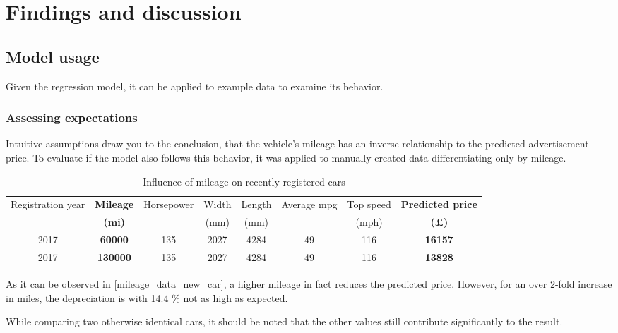 \chapter{Findings and discussion}
\section{Model usage}
Given the regression model, it can be applied to example data to examine its behavior.
\subsection{Assessing expectations}
Intuitive assumptions draw you to the conclusion, that the vehicle's mileage has an inverse relationship to the predicted advertisement price.
To evaluate if the model also follows this behavior, it was applied to manually created data differentiating only by mileage.
\begin{table}[H]
    \begin{adjustbox}{width={\textwidth}}
        \begin{tabular}{|c|c|c|c|c|c|c|c|}
            \hline
            Registration year & \textbf{Mileage} & Horsepower & Width & Length & Average mpg & Top speed & \textbf{Predicted price} \\
                              & \textbf{(mi)}    &            & (mm)  & (mm)   &             & (mph)     & \textbf{(£)}             \\ \hline
            2017              & \textbf{60000}   & 135        & 2027  & 4284   & 49          & 116       & \textbf{16157}           \\\hline
            2017              & \textbf{130000}  & 135        & 2027  & 4284   & 49          & 116       & \textbf{13828}           \\\hline
        \end{tabular}
    \end{adjustbox}
    \caption{Influence of mileage on recently registered cars}
    \label{mileage_data_new_car}
\end{table}
As it can be observed in \autoref{mileage_data_new_car}, a higher mileage in fact reduces the predicted price.
However, for an over 2-fold increase in miles, the depreciation is with 14.4 \% not as high as expected.
\par
While comparing two otherwise identical cars, it should be noted that the other values still contribute significantly to the
result.
\newline
